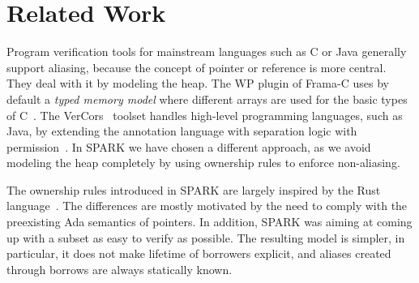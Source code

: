 \documentclass[runningheads]{llncs}
\begin{document}

\section{Related Work}
Program verification tools for mainstream languages such as C or Java generally support aliasing, because the concept of pointer or reference is more central. They deal with it by modeling the heap. The WP plugin of Frama-C uses by default a \emph{typed memory model} where different arrays are used for the basic types of C~\cite{kirchner2015frama}. The VerCors~\cite{blom2017vercors} toolset handles high-level programming languages, such as Java, by extending the annotation language with separation logic with permission~\cite{reynolds2002separation}. In SPARK we have chosen a different approach, as we avoid modeling the heap completely by using ownership rules to enforce non-aliasing.

The ownership rules introduced in SPARK are largely inspired by the Rust language~\cite{rust}. The differences are mostly motivated by the need to comply with the preexisting Ada semantics of pointers. In addition, SPARK was aiming at coming up with a subset as easy to verify as possible. The resulting model is simpler, in particular, it does not make lifetime of borrowers explicit, and aliases created through borrows are always statically known. %
\end{document}
